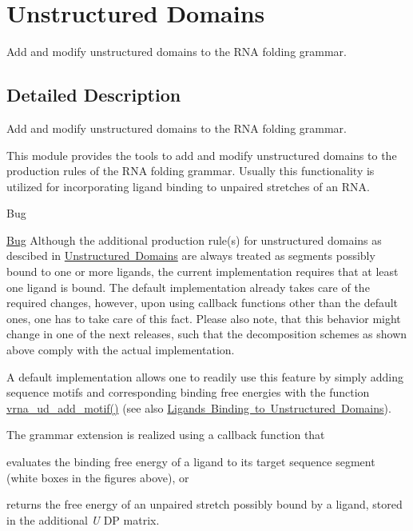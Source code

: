 \hypertarget{group__domains__up}{}\section{Unstructured Domains}
\label{group__domains__up}


Add and modify unstructured domains to the R\+NA folding grammar.  




\subsection{Detailed Description}
Add and modify unstructured domains to the R\+NA folding grammar. 

This module provides the tools to add and modify unstructured domains to the production rules of the R\+NA folding grammar. Usually this functionality is utilized for incorporating ligand binding to unpaired stretches of an R\+NA.

\begin{DoxyRefDesc}{Bug}
\item[\mbox{\hyperlink{bug__bug000003}{Bug}}]Although the additional production rule(s) for unstructured domains as descibed in \mbox{\hyperlink{folding_grammar_sec_domains_up}{Unstructured Domains}} are always treated as \textquotesingle{}segments possibly bound to one or more ligands\textquotesingle{}, the current implementation requires that at least one ligand is bound. The default implementation already takes care of the required changes, however, upon using callback functions other than the default ones, one has to take care of this fact. Please also note, that this behavior might change in one of the next releases, such that the decomposition schemes as shown above comply with the actual implementation.\end{DoxyRefDesc}


A default implementation allows one to readily use this feature by simply adding sequence motifs and corresponding binding free energies with the function \mbox{\hyperlink{group__domains__up_ga55f7de5ef5b7472b0eeab9296b57f671}{vrna\+\_\+ud\+\_\+add\+\_\+motif()}} (see also \mbox{\hyperlink{group__ligands__up}{Ligands Binding to Unstructured Domains}}).

The grammar extension is realized using a callback function that
\begin{DoxyItemize}
\item evaluates the binding free energy of a ligand to its target sequence segment (white boxes in the figures above), or
\item returns the free energy of an unpaired stretch possibly bound by a ligand, stored in the additional {\itshape U} DP matrix.
\end{DoxyItemize}

